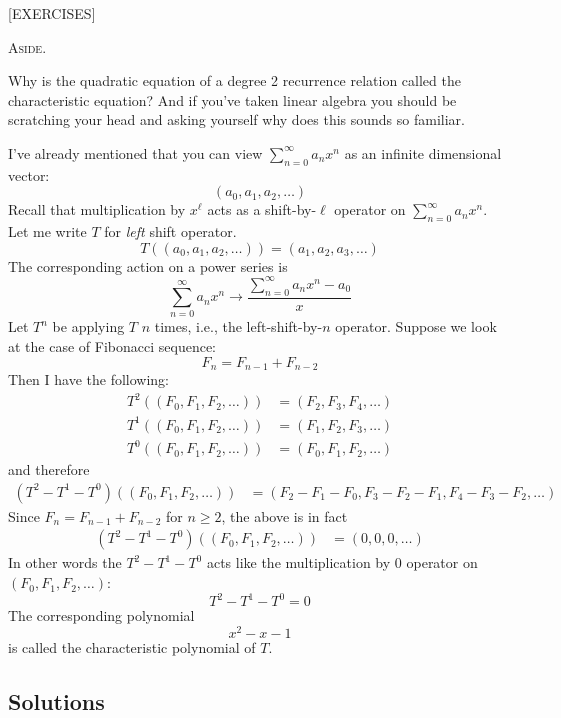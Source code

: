 [EXERCISES]

\textsc{Aside}.

Why is the quadratic equation of a degree 2 recurrence relation
called the characteristic equation?
And if you've taken linear algebra you should be scratching your
head and asking yourself why does this sounds so familiar.

I've already mentioned that you can view $\sum_{n=0}^\infty a_n x^n$
as an infinite dimensional vector:
\[
(a_0, a_1, a_2, \ldots)
\]
Recall that multiplication by $x^\ell$ acts as a shift-by-$\ell$ operator
on $\sum_{n=0}^\infty a_n x^n$.
Let me write $T$ for \textit{left} shift operator.
\[
T((a_0, a_1, a_2, \ldots)) = (a_1, a_2, a_3, \ldots)
\]
The corresponding action on a power series is
\[
\sum_{n=0}^\infty a_n x^n \rightarrow \frac{\sum_{n=0}^\infty a_n x^n - a_0}{x}
\]
Let $T^n$ be applying $T$ $n$ times, i.e., the left-shift-by-$n$ operator.
Suppose we look at the case of Fibonacci sequence:
\[
F_n = F_{n-1} + F_{n-2}
\]
Then I have the following:
\begin{align*}
T^2((F_0, F_1, F_2, \ldots)) &= (F_2, F_3, F_4, \ldots) \\
T^1((F_0, F_1, F_2, \ldots)) &= (F_1, F_2, F_3, \ldots) \\
T^0((F_0, F_1, F_2, \ldots)) &= (F_0, F_1, F_2, \ldots)
\end{align*}
and therefore
\begin{align*}
(T^2 - T^1 - T^0)((F_0, F_1, F_2, \ldots)) 
&= (F_2 - F_1 - F_0, F_3 - F_2 - F_1, F_4 - F_3 - F_2, \ldots)
\end{align*}
Since $F_n = F_{n-1} + F_{n-2}$ for $n \geq 2$, the above is in fact
\begin{align*}
(T^2 - T^1 - T^0)((F_0, F_1, F_2, \ldots)) 
&= (0, 0, 0, \ldots)
\end{align*}
In other words the $T^2 - T^1 - T^0$ acts like the multiplication by $0$
operator on $(F_0, F_1, F_2, \ldots)$:
\[
T^2 - T^1 - T^0 = 0
\]
The corresponding polynomial 
\[
x^2 - x - 1
\]
is called the characteristic polynomial of $T$.

\newpage
\subsection*{Solutions}
